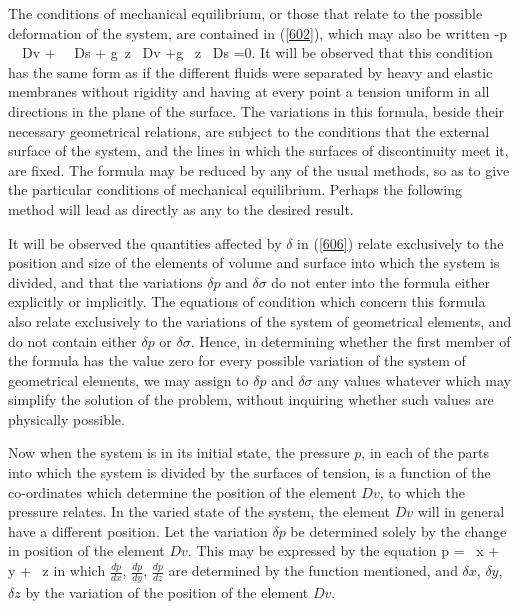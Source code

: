 \documentclass[12pt]{article}
\newcommand{\dd}{\delta}
\begin{document}
The conditions of mechanical equilibrium, or those that relate to the possible deformation of the system, are contained in (\ref{602}), which may also be written
\eqs -\int p \, \dd \, Dv + \int \sigma \, \dd \, Ds + \int g\gamma \, \dd z \, Dv +\int g \Gamma\, \dd z \, Ds =0.   \label{606} \eqe
It will be observed that this condition has the same form as if the different fluids were separated by heavy and elastic membranes without rigidity and having at every point a tension uniform in all directions in the plane of the surface. The variations in this formula, beside their necessary geometrical relations, are subject to the conditions that the external surface of the system, and the lines in which the surfaces of discontinuity meet it, are fixed. The formula may be reduced by any of the usual methods, so as to give the particular conditions of mechanical equilibrium. Perhaps the following method will lead as directly as any to the desired result.

It will be observed the quantities affected by $\dd$ in (\ref{606}) relate exclusively to the position and size of the elements of volume and surface into which the system is divided, and that the variations $\dd p$ and $\dd \sigma$ do not enter into the formula either explicitly or implicitly. The equations of condition which concern this formula also relate exclusively to the variations of the system of geometrical elements, and do not contain either $\dd p$ or $\dd \sigma$. Hence, in determining whether the first member of the formula has the value zero for every possible variation of the system of geometrical elements, we may assign to $\dd p$ and $\dd \sigma$ any values whatever which may simplify the solution of the problem, without inquiring whether such values are physically possible.

Now when the system is in its initial state, the pressure $p$, in each of the parts into which the system is divided by the surfaces of tension, is a function of the co-ordinates which determine the position of the element $Dv$, to which the pressure relates. In the varied state of the system, the element $Dv$ will in general have a different position. Let the variation $\dd p$ be determined solely by the change in position of the element $Dv$. This may be expressed by the equation
\eqs \dd p = \, \dd x + \, \dd y + \, \dd z \label{607} \eqe
in which $\frac{dp}{dx}$, $\frac{dp}{dy}$, $\frac{dp}{dz}$ are determined by the function mentioned, and $\dd x$, $\dd y$, $\dd z$ by the variation of the position of the element $Dv$.
\end{document}
